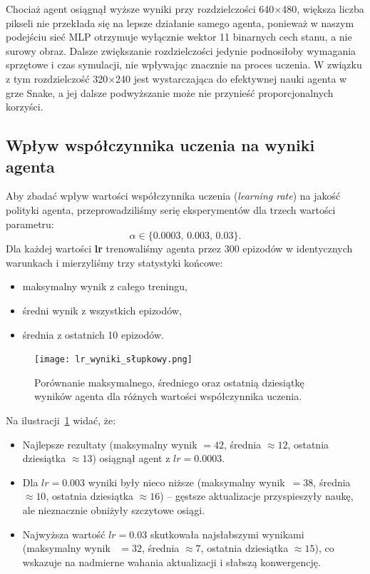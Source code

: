 \documentclass[a4paper,12pt]{article}
\begin{document}
Chociaż agent osiągnął wyższe wyniki przy rozdzielczości 640×480, większa liczba pikseli nie przekłada się na lepsze działanie samego agenta, ponieważ w naszym podejściu sieć MLP otrzymuje wyłącznie wektor 11 binarnych cech stanu, a nie surowy obraz. Dalsze zwiększanie rozdzielczości jedynie podnosiłoby wymagania sprzętowe i czas symulacji, nie wpływając znacznie na proces uczenia. W związku z tym rozdzielczość 320×240 jest wystarczająca do efektywnej nauki agenta w grze Snake, a jej dalsze podwyższanie może nie przynieść proporcjonalnych korzyści.  



\subsection{Wpływ współczynnika uczenia na wyniki agenta}
\label{sec:experiments:learning_rate}

Aby zbadać wpływ wartości współczynnika uczenia (\emph{learning rate}) na jakość polityki agenta, przeprowadziliśmy serię eksperymentów dla trzech wartości parametru: 
\[
\alpha \in \{0.0003,\,0.003,\,0.03\}.
\]
Dla każdej wartości \textbf{lr} trenowaliśmy agenta przez 300 epizodów w identycznych warunkach i mierzyliśmy trzy statystyki końcowe:
\begin{itemize}
  \item maksymalny wynik z całego treningu,
  \item średni wynik z wszystkich epizodów,
  \item średnia z ostatnich 10 epizodów.
\end{itemize}

\begin{figure}[H]
  \centering
  \texttt{[image: lr\_wyniki\_słupkowy.png]}
  \caption{Porównanie maksymalnego, średniego oraz ostatnią dziesiątkę wyników agenta dla różnych wartości współczynnika uczenia.}
  \label{fig:lr_bar}
\end{figure}

Na ilustracji~\ref{fig:lr_bar} widać, że:
\begin{itemize}
  \item Najlepsze rezultaty (maksymalny wynik $= 42$, średnia $\approx12$, ostatnia dziesiątka $\approx13$) osiągnął agent z \(lr = 0.0003\).
  \item Dla \(lr = 0.003\) wyniki były nieco niższe (maksymalny wynik\ $= 38$, średnia $\approx10$, ostatnia dziesiątka $\approx16$) – gęstsze aktualizacje przyspieszyły naukę, ale nieznacznie obniżyły szczytowe osiągi.
  \item Najwyższa wartość \(lr = 0.03\) skutkowała najsłabszymi wynikami (maksymalny wynik \ $= 32$, średnia $\approx7$, ostatnia dziesiątka $\approx15$), co wskazuje na nadmierne wahania aktualizacji i słabszą konwergencję.
\end{itemize}
\end{document}
